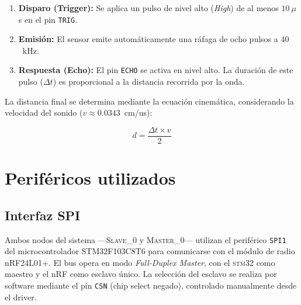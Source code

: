 \documentclass[12pt,a4paper]{article}
\begin{document}
\begin{enumerate}
    \item \textbf{Disparo (Trigger):} Se aplica un pulso de nivel alto (\textit{High}) de al menos $10~\mu$s en el pin \texttt{TRIG}.
    \item \textbf{Emisión:} El sensor emite automáticamente una ráfaga de ocho pulsos a $40$~kHz.
    \item \textbf{Respuesta (Echo):} El pin \texttt{ECHO} se activa en nivel alto. La duración de este pulso ($\Delta t$) es proporcional a la distancia recorrida por la onda.
\end{enumerate}

La distancia final se determina mediante la ecuación cinemática, considerando la velocidad del sonido ($v \approx 0.0343$~cm/us):

\begin{equation}
    d = \frac{\Delta t \times v}{2}
\end{equation}


\section{Periféricos utilizados}

\subsection{Interfaz SPI}                                                                                                                                                                                                                                      
                                                                                                                                                                                                                                                                                                                                                                                                                                                                                                                     
Ambos nodos del sistema —\textsc{Slave\_0} y \textsc{Master\_0}— utilizan el periférico \texttt{SPI1} del microcontrolador STM32F103C8T6 para comunicarse con el módulo de radio nRF24L01+. El bus opera en modo \textit{Full-Duplex Master}, con el        
  \textsc{stm32} como maestro y el nRF como esclavo único. La selección del esclavo se realiza por software mediante el pin \texttt{CSN} (chip select negado), controlado manualmente desde el driver.                                                        
                                                                                                                                                                                                                                                              
\end{document}
